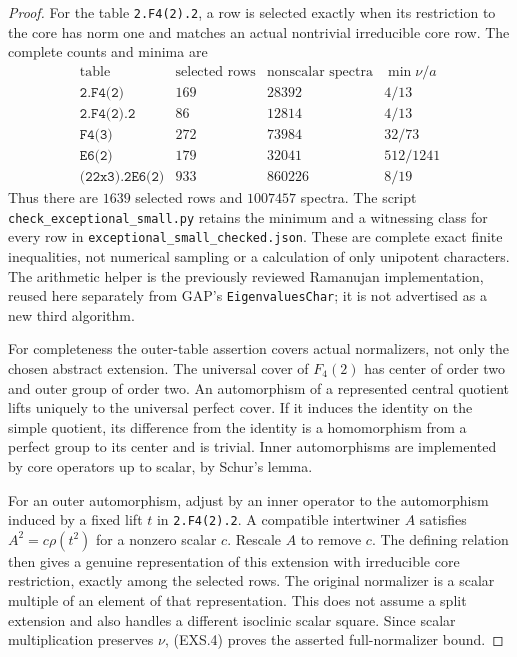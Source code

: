 \begin{proof}
For the table \texttt{2.F4(2).2}, a row is selected exactly when
its restriction to the core has norm one and matches an actual
nontrivial irreducible core row. The complete counts and minima are
\[
\begin{array}{c|r|r|c}
\text{table}&\text{selected rows}&\text{nonscalar spectra}&\min\nu/a\\\hline
\texttt{2.F4(2)}&169&28392&4/13\\
\texttt{2.F4(2).2}&86&12814&4/13\\
\texttt{F4(3)}&272&73984&32/73\\
\texttt{E6(2)}&179&32041&512/1241\\
\texttt{(2\^{}2x3).2E6(2)}&933&860226&8/19
\end{array}                                                    \tag{EXS.4}
\]
Thus there are $1639$ selected rows and $1007457$ spectra.
The script \texttt{check\_exceptional\_small.py} retains the minimum
and a witnessing class for every row in
\texttt{exceptional\_small\_checked.json}. These are complete exact
finite inequalities, not numerical sampling or a calculation of only
unipotent characters. The arithmetic helper is the previously reviewed
Ramanujan implementation, reused here separately from GAP's
\texttt{EigenvaluesChar}; it is not advertised as a new third algorithm.

For completeness the outer-table assertion covers actual normalizers,
not only the chosen abstract extension. The universal cover of $F_4(2)$
has center of order two and outer group of order two. An automorphism
of a represented central quotient lifts uniquely to the universal
perfect cover. If it induces the identity on the simple quotient,
its difference from the identity is a homomorphism from a perfect
group to its center and is trivial. Inner automorphisms are implemented
by core operators up to scalar, by Schur's lemma.

For an outer automorphism, adjust by an inner operator to the
automorphism induced by a fixed lift $t$ in \texttt{2.F4(2).2}.
A compatible intertwiner $A$ satisfies $A^2=c\rho(t^2)$ for a
nonzero scalar $c$. Rescale $A$ to remove $c$. The defining relation
then gives a genuine representation of this extension with irreducible
core restriction, exactly among the selected rows. The original
normalizer is a scalar multiple of an element of that representation.
This does not assume a split extension and also handles a different
isoclinic scalar square. Since scalar multiplication preserves $\nu$,
(EXS.4) proves the asserted full-normalizer bound.
\end{proof}

